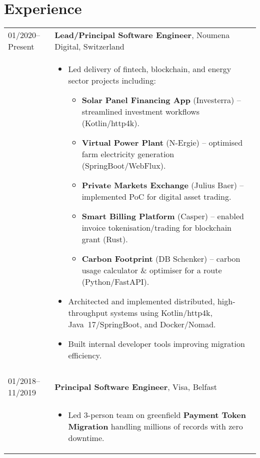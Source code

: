 \documentclass[2pt,a4paper]{article}
\newlength{\datecolumn}
\newlength{\textcolumn}
\begin{document}
\section*{Experience}
\begin{longtable}{p{\datecolumn} p{\textcolumn}}
01/2020--Present & \textbf{Lead/Principal Software Engineer}, Noumena Digital, Switzerland \\
                 & \begin{itemize}
                        \item Led delivery of fintech, blockchain, and energy sector projects including:
                        \begin{itemize}
                            \item \textbf{Solar Panel Financing App} (Investerra) – streamlined investment workflows (Kotlin/http4k).
                            \item \textbf{Virtual Power Plant} (N-Ergie) – optimised farm electricity generation (SpringBoot/WebFlux).
                            \item \textbf{Private Markets Exchange} (Julius Baer) – implemented PoC for digital asset trading.
                            \item \textbf{Smart Billing Platform} (Casper) – enabled invoice tokenisation/trading for blockchain grant (Rust).
                            \item \textbf{Carbon Footprint} (DB Schenker) – carbon usage calculator \& optimiser for a route (Python/FastAPI).
                        \end{itemize} 
                        \item Architected and implemented distributed, high-throughput systems using Kotlin/http4k, Java~17/SpringBoot, and Docker/Nomad.
                        \item Built internal developer tools improving migration efficiency.
                   \end{itemize} \\ \\
01/2018--11/2019 & \textbf{Principal Software Engineer}, Visa, Belfast \\
                 & \begin{itemize}
                        \item Led 3-person team on greenfield \textbf{Payment Token Migration} handling millions of records with zero downtime.

\end{itemize}
\end{longtable}
\end{document}
